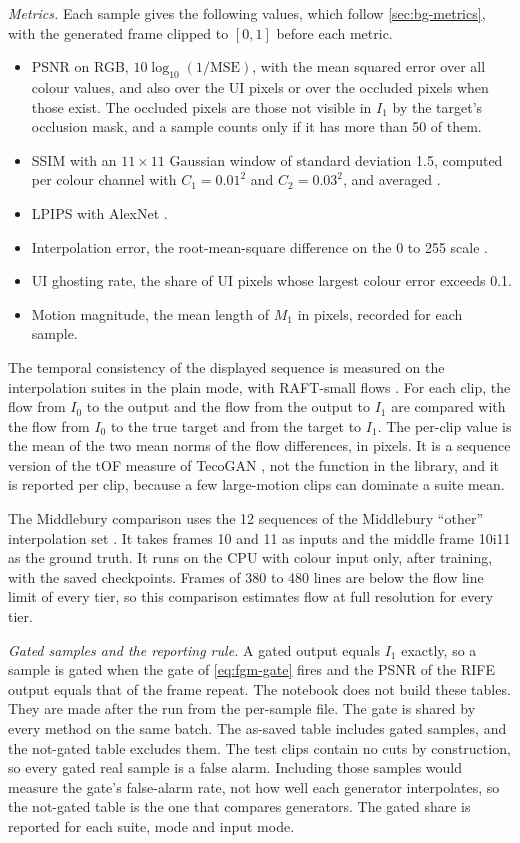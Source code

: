 \emph{Metrics.} Each sample gives the following values, which follow \cref{sec:bg-metrics}, with the generated frame clipped to $[0,1]$ before each metric.
\begin{itemize}
\item PSNR on RGB, $10\log_{10}(1/\mathrm{MSE})$, with the mean squared error over all colour values, and also over the UI pixels or over the occluded pixels when those exist. The occluded pixels are those not visible in $I_1$ by the target's occlusion mask, and a sample counts only if it has more than 50 of them.
\item SSIM with an $11\times11$ Gaussian window of standard deviation 1.5, computed per colour channel with $C_1=0.01^2$ and $C_2=0.03^2$, and averaged \cite{wang2004ssim}.
\item LPIPS with AlexNet \cite{zhang2018lpips}.
\item Interpolation error, the root-mean-square difference on the 0 to 255 scale \cite{baker2011middlebury}.
\item UI ghosting rate, the share of UI pixels whose largest colour error exceeds 0.1.
\item Motion magnitude, the mean length of $M_1$ in pixels, recorded for each sample.
\end{itemize}
The temporal consistency of the displayed sequence is measured on the interpolation suites in the plain mode, with RAFT-small flows \cite{teed2020raft}. For each clip, the flow from $I_0$ to the output and the flow from the output to $I_1$ are compared with the flow from $I_0$ to the true target and from the target to $I_1$. The per-clip value is the mean of the two mean norms of the flow differences, in pixels. It is a sequence version of the tOF measure of TecoGAN \cite{chu2020tecogan}, not the function in the library, and it is reported per clip, because a few large-motion clips can dominate a suite mean.

The Middlebury comparison uses the 12 sequences of the Middlebury ``other'' interpolation set \cite{baker2011middlebury}. It takes frames 10 and 11 as inputs and the middle frame 10i11 as the ground truth. It runs on the CPU with colour input only, after training, with the saved checkpoints. Frames of 380 to 480 lines are below the flow line limit of every tier, so this comparison estimates flow at full resolution for every tier.

\emph{Gated samples and the reporting rule.} A gated output equals $I_1$ exactly, so a sample is gated when the gate of \cref{eq:fgm-gate} fires and the PSNR of the RIFE output equals that of the frame repeat. The notebook does not build these tables. They are made after the run from the per-sample file. The gate is shared by every method on the same batch. The as-saved table includes gated samples, and the not-gated table excludes them. The test clips contain no cuts by construction, so every gated real sample is a false alarm. Including those samples would measure the gate's false-alarm rate, not how well each generator interpolates, so the not-gated table is the one that compares generators. The gated share is reported for each suite, mode and input mode.

